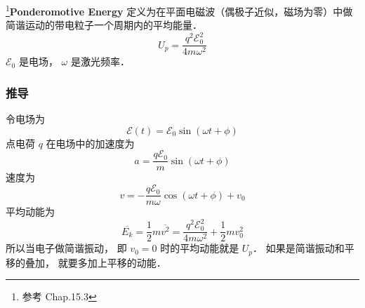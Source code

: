 

\footnote{参考 \cite{Brandsen} Chap.15.3}\textbf{Ponderomotive Energy} 定义为在平面电磁波（偶极子近似，磁场为零）中做简谐运动的带电粒子一个周期内的平均能量．
\begin{equation}\label{Ponder_eq1}
U_p = \frac{q^2 \mathcal E_0^2}{4m\omega^2}
\end{equation}
$\mathcal E_0$ 是电场， $\omega$ 是激光频率．

\subsubsection{推导}
令电场为
\begin{equation}
\mathcal E(t) = \mathcal E_0 \sin(\omega t + \phi)
\end{equation}
点电荷 $q$ 在电场中的加速度为
\begin{equation}
a = \frac{q\mathcal E_0}{m} \sin(\omega t + \phi)
\end{equation}
速度为
\begin{equation}
v = -\frac{q\mathcal E_0}{m\omega} \cos(\omega t + \phi) + v_0
\end{equation}
平均动能为
\begin{equation}
\overline{E_k} = \frac{1}{2}m \overline{v^2} = \frac{q^2\mathcal E_0^2}{4m\omega^2} + \frac{1}{2}mv_0^2
\end{equation}
所以当电子做简谐振动， 即 $v_0 = 0$ 时的平均动能就是 $U_p$． 如果是简谐振动和平移的叠加， 就要多加上平移的动能．
